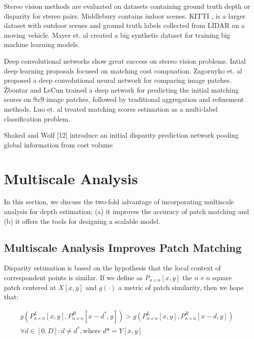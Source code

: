 \documentclass[runningheads]{llncs}
\begin{document}
Stereo vision methods are evaluated on datasets containing ground truth depth or disparity for stereo pairs. Middlebury \cite{Scharstein2014} contains indoor scenes. KITTI \cite{Menze2015ISA}, \cite{Menze2018JPRS} is a larger dataset with outdoor scenes and ground truth labels collected from LIDAR on a moving vehicle. Mayer et. al \cite{Mayer2016ALD} created a big synthetic dataset for training big machine learning models.

Deep convolutional networks show great success on stereo vision problems. Intial deep learning proposals focused on matching cost compuation. Zagoruyko et. al \cite{Zagoruyko2015LearningNetworks} proposed a deep convolutional neural network for comparing image patches. \v{Z}bontar and LeCun \cite{Zbontar_2015_CVPR} trained a deep network for predicting the initial matching scores on $9x9$ image patches, followed by traditional aggregation and refinement methods. Luo et. al \cite{Luo2016EfficientMatching} treated matching scores estimation as a multi-label classification problem.

Shaked and Wolf [12] introduce an initial disparity prediction network pooling global information from cost volume

\section{Multiscale Analysis}

In this section, we discuss the two-fold advantage of incorporating multiscale analysis for depth estimation; (a) it improves the accuracy of patch matching and (b) it offers the tools for designing a scalable model.

\subsection{Multiscale Analysis Improves Patch Matching}

Disparity estimation is based on the hypothesis that the local context of correspondent points is similar. If we define as $P_{n \times n}[x,y]$ the  $n \times n$ square patch centered at $X[x,y]$ and $g(\cdot)$ a metric of patch similarity, then we hope that:

\begin{equation}
\begin{gathered} \label{eq:similarity_hypothesis}
    g(P^L_{n \times n}[x,y], P^R_{n \times n}[x-d^*,y]) > g(P^L_{n \times n}[x,y], P^R_{n \times n}[x-d,y]) \\
    \forall d \in [0,D] : d \neq d^*, \text{where $d* = Y[x,y]$}
\end{gathered}
\end{equation}
\end{document}
